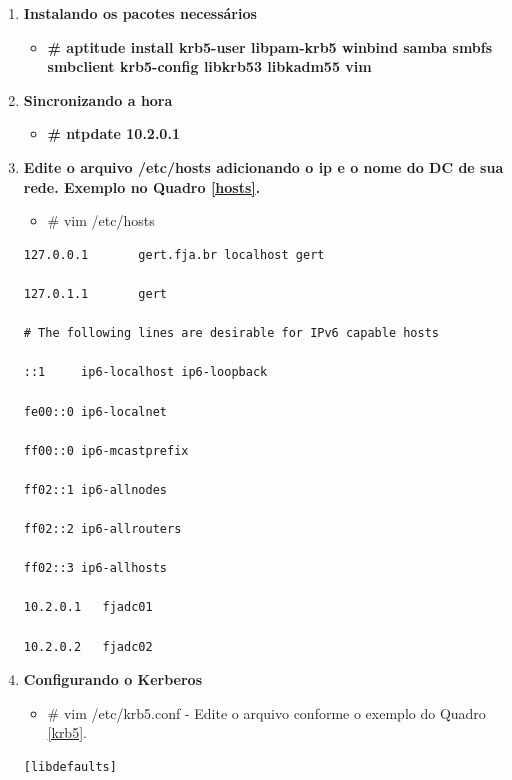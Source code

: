 \begin{enumerate}
	\item \textbf{Instalando os pacotes necessários}
\begin{itemize}
	\item \textbf{\# aptitude install krb5-user libpam-krb5 winbind samba smbfs smbclient krb5-config libkrb53 libkadm55 vim}
\end{itemize}

	\item \textbf{Sincronizando a hora}

\begin{itemize}
	\item \textbf{\# ntpdate 10.2.0.1} 
\end{itemize}

	\item \textbf{Edite o arquivo /etc/hosts adicionando o ip e o nome do DC de sua rede. Exemplo no Quadro \ref{hosts}.}
	\begin{itemize}
			\item \# vim /etc/hosts\\
	\end{itemize}
		\begin{lstlisting}[caption=Valores que devem ser adicionados no /etc/hosts,label={hosts}]
127.0.0.1       gert.fja.br localhost gert

127.0.1.1       gert

# The following lines are desirable for IPv6 capable hosts

::1     ip6-localhost ip6-loopback

fe00::0 ip6-localnet

ff00::0 ip6-mcastprefix

ff02::1 ip6-allnodes

ff02::2 ip6-allrouters

ff02::3 ip6-allhosts

10.2.0.1   fjadc01

10.2.0.2   fjadc02

\end{lstlisting}

	\item \textbf{Configurando o Kerberos}
		\begin{itemize}
			\item {\# vim /etc/krb5.conf} - Edite o arquivo conforme o exemplo do Quadro \ref{krb5}.\\
		\end{itemize}
		\begin{lstlisting}[caption=Valores que devem ser adicionados no /etc/krb5.conf,label={krb5}]
[libdefaults]


\end{lstlisting}
\end{enumerate}
